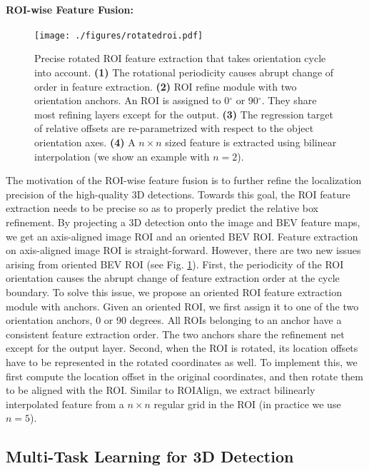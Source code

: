 \documentclass[10pt,twocolumn,letterpaper]{article}
\begin{document}
\paragraph{ROI-wise Feature Fusion:}
\begin{figure}[t]
\begin{center}
 \texttt{[image: ./figures/rotatedroi.pdf]}
\end{center}
   \caption{Precise rotated ROI feature extraction that takes orientation cycle into account. \textbf{(1)} The rotational periodicity causes abrupt change of order in feature extraction. \textbf{(2)} ROI refine module with two orientation anchors. An ROI is assigned to 0$^\circ$ or 90$^\circ$. They share most refining layers except for the output. \textbf{(3)} The regression target of relative offsets are re-parametrized with respect to the object orientation axes. \textbf{(4)} A $n\times n$ sized feature is extracted using bilinear interpolation (we show an example with $n=2$).}
\label{fig:roi}
\end{figure}
The motivation of the ROI-wise feature fusion is to further refine the localization precision of the high-quality 3D detections. Towards this goal, the ROI feature extraction needs to be precise so as to properly predict the relative box refinement. By projecting a 3D detection onto the image and BEV feature maps, we get an axis-aligned image ROI and an oriented BEV ROI. Feature extraction on axis-aligned image ROI is straight-forward. However, there are two new issues arising from oriented BEV ROI (see Fig. \ref{fig:roi}). First, the periodicity of the ROI orientation causes the abrupt change of feature extraction order at the cycle boundary. To solve this issue, we propose an oriented ROI feature extraction module with anchors. Given an oriented ROI, we first assign it to one of the two orientation anchors, 0 or 90 degrees. All ROIs belonging to an anchor have a consistent feature extraction order. The two anchors share the refinement net except for the output layer. Second, when the ROI is rotated, its location offsets have to be represented in the rotated coordinates as well. To implement this, we first compute the location offset in the original coordinates, and then rotate them to be aligned with the ROI. Similar to ROIAlign\cite{maskrcnn}, we extract bilinearly interpolated feature from a $n\times n$ regular grid in the ROI (in practice we use $n=5$).


\subsection{Multi-Task Learning for 3D Detection}
\end{document}
